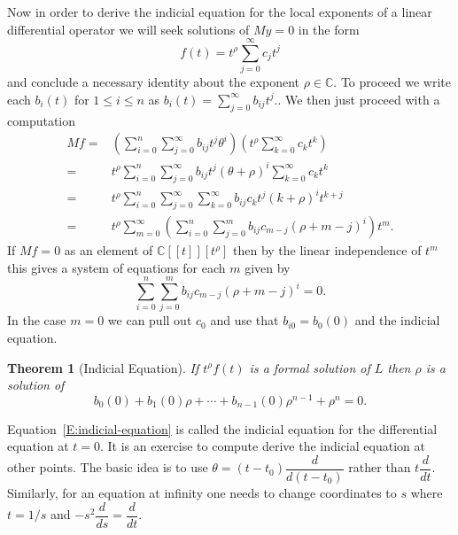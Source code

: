 \documentclass[12pt]{book}
\numberwithin{equation}{section}
\newtheorem{theorem}{Theorem}[subsection]
\theoremstyle{definition}
\theoremstyle{remark}
\newcommand{\CC}{\mathbb{C}}
\begin{document}
Now in order to derive the indicial equation for the local exponents of a linear differential operator we will seek solutions of $My=0$ in the form 
 $$ f(t) = t^{\rho} \sum_{j=0}^{\infty} c_j t^j $$
and conclude a necessary identity about the exponent $\rho \in \CC$. 
To proceed we write each $b_i(t)$ for $1\leq i \leq n$ as $b_i(t) = \sum_{j=0}^{\infty} b_{ij}t^j.$.
We then just proceed with a computation
\begin{align*}
Mf =& \left( \sum_{i=0}^n \sum_{j=0}^{\infty} b_{ij}t^j \theta^i \right) \left( t^{\rho} \sum_{k=0}^{\infty} c_k t^k \right) \\
=&t^{\rho} \sum_{i=0}^n \sum_{j=0}^{\infty} b_{ij} t^j (\theta+\rho)^i \sum_{k=0}^{\infty} c_k t^k \\
=&t^{\rho} \sum_{i=0}^n \sum_{j=0}^{\infty} \sum_{k=0}^{\infty} b_{ij} c_k t^j (k+\rho)^i  t^{k+j} \\
=& t^{\rho} \sum_{m=0}^{\infty}\left( \sum_{i=0}^n \sum_{j=0}^m b_{ij} c_{m-j}(\rho+m-j)^i\right)t^m.
\end{align*}
If $Mf=0$ as an element of $\CC[[t]][t^{\rho}]$ then by the linear independence of $t^m$ this gives a system of  equations for each $m$ given by 
 $$   \sum_{i=0}^n \sum_{j=0}^m b_{ij} c_{m-j}(\rho+m-j)^i=0.$$
In the case $m=0$ we can pull out $c_0$ and use that $b_{i0} = b_0(0)$ and the indicial equation.

\begin{theorem}[Indicial Equation]
	If $t^{\rho}f(t)$ is a formal solution of $L$ then $\rho$ is a solution of 
	 \begin{equation}\label{E:indicial-equation}
	  b_0(0) + b_1(0) \rho + \cdots + b_{n-1}(0)\rho^{n-1} + \rho^n =0.
	 \end{equation}
\end{theorem}
Equation~\ref{E:indicial-equation} is called the indicial equation for the differential equation at $t=0$. 
It is an exercise to compute derive the indicial equation at other points. 
The basic idea is to use $\theta = (t-t_0) \dfrac{d}{d(t-t_0)}$ rather than $t\dfrac{d}{dt}$. 
Similarly, for an equation at infinity one needs to change coordinates to $s$ where $t=1/s$ and $-s^2\dfrac{d}{ds}=\dfrac{d}{dt}$.
\end{document}
